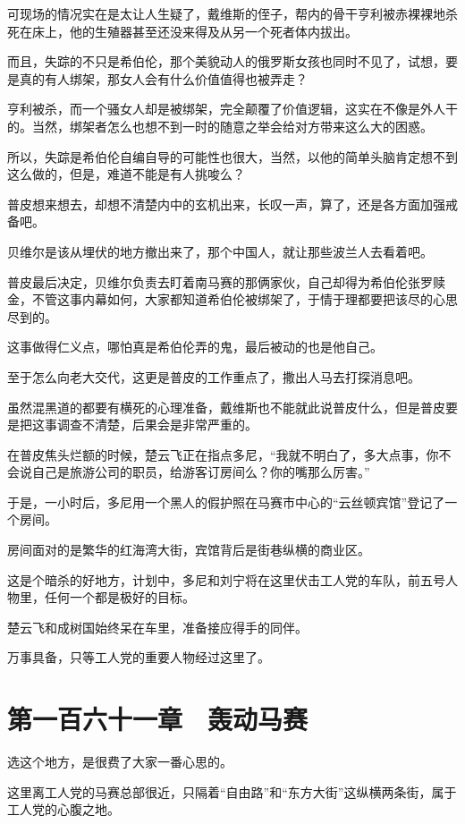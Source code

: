 可现场的情况实在是太让人生疑了，戴维斯的侄子，帮内的骨干亨利被赤裸裸地杀死在床上，他的生殖器甚至还没来得及从另一个死者体内拔出。

而且，失踪的不只是希伯伦，那个美貌动人的俄罗斯女孩也同时不见了，试想，要是真的有人绑架，那女人会有什么价值值得也被弄走？

亨利被杀，而一个骚女人却是被绑架，完全颠覆了价值逻辑，这实在不像是外人干的。当然，绑架者怎么也想不到一时的随意之举会给对方带来这么大的困惑。

所以，失踪是希伯伦自编自导的可能性也很大，当然，以他的简单头脑肯定想不到这么做的，但是，难道不能是有人挑唆么？

普皮想来想去，却想不清楚内中的玄机出来，长叹一声，算了，还是各方面加强戒备吧。

贝维尔是该从埋伏的地方撤出来了，那个中国人，就让那些波兰人去看着吧。

普皮最后决定，贝维尔负责去盯着南马赛的那俩家伙，自己却得为希伯伦张罗赎金，不管这事内幕如何，大家都知道希伯伦被绑架了，于情于理都要把该尽的心思尽到的。

这事做得仁义点，哪怕真是希伯伦弄的鬼，最后被动的也是他自己。

至于怎么向老大交代，这更是普皮的工作重点了，撒出人马去打探消息吧。

虽然混黑道的都要有横死的心理准备，戴维斯也不能就此说普皮什么，但是普皮要是把这事调查不清楚，后果会是非常严重的。

在普皮焦头烂额的时候，楚云飞正在指点多尼，“我就不明白了，多大点事，你不会说自己是旅游公司的职员，给游客订房间么？你的嘴那么厉害。”

于是，一小时后，多尼用一个黑人的假护照在马赛市中心的“云丝顿宾馆”登记了一个房间。

房间面对的是繁华的红海湾大街，宾馆背后是街巷纵横的商业区。

这是个暗杀的好地方，计划中，多尼和刘宁将在这里伏击工人党的车队，前五号人物里，任何一个都是极好的目标。

楚云飞和成树国始终呆在车里，准备接应得手的同伴。

万事具备，只等工人党的重要人物经过这里了。

\section{第一百六十一章　轰动马赛}

选这个地方，是很费了大家一番心思的。

这里离工人党的马赛总部很近，只隔着“自由路”和“东方大街”这纵横两条街，属于工人党的心腹之地。

